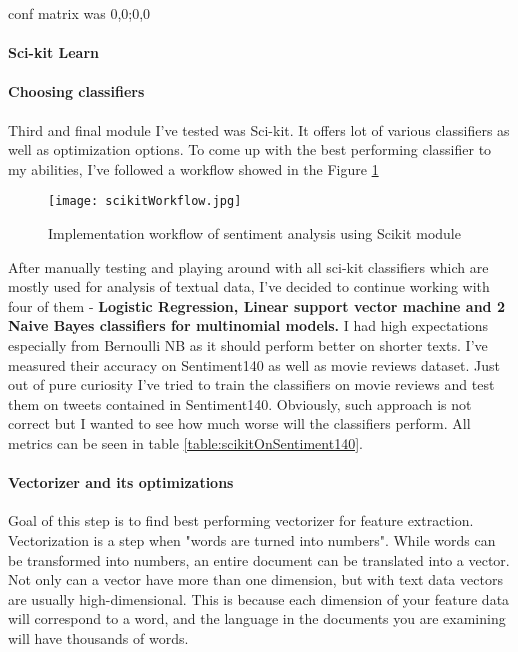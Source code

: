 conf matrix was 0,0;0,0

\paragraph{Sci-kit Learn}\paragraph{Choosing classifiers}
Third and final module I've tested was Sci-kit. It offers lot of various classifiers as well as optimization options. To come up with the best performing classifier to my abilities, I've followed a workflow showed in the Figure \ref{fig:scikitWorkflow}

\begin{figure}[H]%
    \centering
	\texttt{[image: scikitWorkflow.jpg]}
    \caption{Implementation workflow of sentiment analysis using Scikit module}%
    \label{fig:scikitWorkflow}%
\end{figure}

After manually testing and playing around with all sci-kit classifiers which are mostly used for analysis of textual data, I've decided to continue working with four of them - \textbf{Logistic Regression, Linear support vector machine and 2 Naive Bayes classifiers for multinomial models.} I had high expectations especially from Bernoulli NB as it should perform better on shorter texts. I've measured their accuracy on Sentiment140 as well as movie reviews dataset. Just out of pure curiosity I've tried to train the classifiers on movie reviews and test them on tweets contained in Sentiment140. Obviously, such approach is not correct but I wanted to see how much worse will the classifiers perform. All metrics can be seen in table \ref{table:scikitOnSentiment140}.

\paragraph{Vectorizer and its optimizations}
Goal of this step is to find best performing vectorizer for feature extraction.	Vectorization is a step when "words are turned into numbers". While words can be transformed into numbers, an entire document can be translated into a vector. Not only can a vector have more than one dimension, but with text data vectors are usually high-dimensional. This is because each dimension of your feature data will correspond to a word, and the language in the documents you are examining will have thousands of words.

